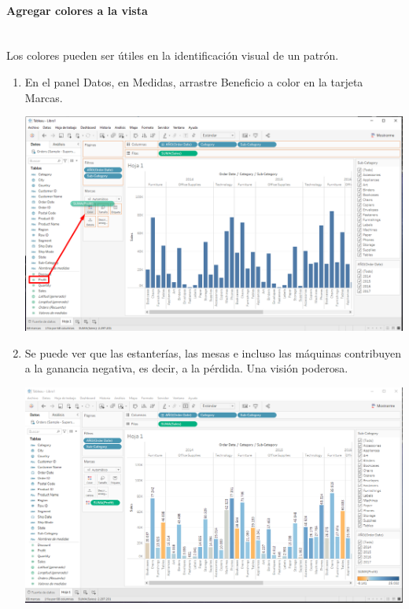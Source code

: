 \documentclass[12pt,letterpaper]{article}
\begin{document}
    \paragraph{\Large Agregar colores a la vista\\ \\}
    Los colores pueden ser útiles en la identificación visual de un patrón.
    \begin{enumerate}
        \item En el panel Datos, en Medidas, arrastre Beneficio a color en la tarjeta Marcas.
        \begin{center}
            \includegraphics[width=15cm]{./img/img20.png}
        \end{center}
        \item Se puede ver que las estanterías, las mesas e incluso las máquinas contribuyen a la ganancia negativa, es decir, a la pérdida. Una visión poderosa.
        \begin{center}
            \includegraphics[width=15cm]{./img/img21.png}
        \end{center}
    \end{enumerate}
\end{document}
